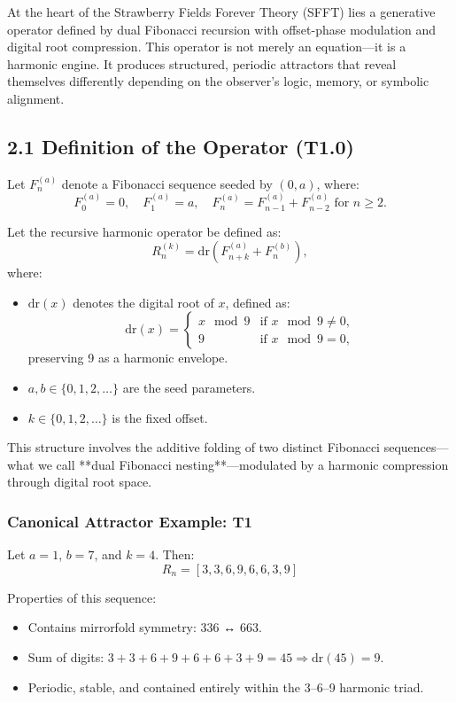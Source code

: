 \documentclass[12pt]{article}
\begin{document}
At the heart of the Strawberry Fields Forever Theory (SFFT) lies a generative operator defined by dual Fibonacci recursion with offset-phase modulation and digital root compression. This operator is not merely an equation—it is a harmonic engine. It produces structured, periodic attractors that reveal themselves differently depending on the observer’s logic, memory, or symbolic alignment.

\subsection*{2.1 Definition of the Operator (T1.0)}

Let \( F^{(a)}_n \) denote a Fibonacci sequence seeded by \( (0, a) \), where:
\[
F^{(a)}_0 = 0,\quad F^{(a)}_1 = a,\quad F^{(a)}_n = F^{(a)}_{n-1} + F^{(a)}_{n-2} \text{ for } n \geq 2.
\]

Let the recursive harmonic operator be defined as:
\[
R^{(k)}_n = \mathrm{dr}\left(F^{(a)}_{n+k} + F^{(b)}_n\right),
\]
where:
\begin{itemize}
    \item \( \mathrm{dr}(x) \) denotes the digital root of \( x \), defined as:
    \[
    \mathrm{dr}(x) = \begin{cases}
        x \mod 9 & \text{if } x \mod 9 \neq 0, \\
        9 & \text{if } x \mod 9 = 0,
    \end{cases}
    \]
    preserving 9 as a harmonic envelope.
    \item \( a, b \in \{0, 1, 2, \dots\} \) are the seed parameters.
    \item \( k \in \{0, 1, 2, \dots\} \) is the fixed offset.
\end{itemize}

This structure involves the additive folding of two distinct Fibonacci sequences—what we call **dual Fibonacci nesting**—modulated by a harmonic compression through digital root space.

\subsubsection*{Canonical Attractor Example: T1}

Let \( a = 1 \), \( b = 7 \), and \( k = 4 \). Then:
\[
R_n = [3, 3, 6, 9, 6, 6, 3, 9]
\]

Properties of this sequence:
\begin{itemize}
    \item Contains mirrorfold symmetry: 336 ↔ 663.
    \item Sum of digits: \( 3+3+6+9+6+6+3+9 = 45 \Rightarrow \mathrm{dr}(45) = 9 \).
    \item Periodic, stable, and contained entirely within the 3–6–9 harmonic triad.
\end{itemize}
\end{document}
